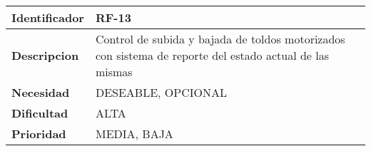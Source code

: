 \begin{center}
    \begin{tabular}{|p{2.6cm}|p{12cm}|}
    \hline
    \textbf{Identificador} & RF-13\\
    \hline
    \textbf{Descripcion} & Control de subida y bajada de toldos motorizados con sistema de reporte del estado actual de las mismas\\
    \hline
    \textbf{Necesidad} & DESEABLE, OPCIONAL\\
    \hline
    \textbf{Dificultad} & ALTA\\
    \hline
    \textbf{Prioridad} & MEDIA, BAJA\\
    \hline
    \end{tabular}
\end{center}
